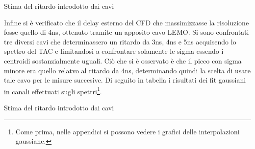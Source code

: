 \begin{table}[h]
	\centering
	
	\caption{Stima del ritardo introdotto dai cavi}
	\label{tab:calib_cavi}
\end{table}
 
Infine si è verificato che il delay esterno del CFD che massimizzasse la risoluzione fosse quello di 4ns, ottenuto tramite un apposito cavo LEMO. Si sono confrontati tre diversi cavi
che determinassero un ritardo da 3ns, 4ns e 5ns acquisendo lo spettro del TAC e limitandosi a confrontare solamente le sigma essendo i centroidi sostanzialmente uguali. Ciò che si 
è osservato è che il picco con sigma minore era quello relatvo al ritardo da 4ns, determinando quindi la scelta di usare tale cavo per le misure succesive. Di seguito in tabella
i risultati dei fit gaussiani in canali effettuati sugli spettri\footnote{Come prima, nelle appendici si possono vedere i grafici delle interpolazioni gaussiane.}. \\

\begin{table}[h]
	\centering
	
	\caption{Stima del ritardo introdotto dai cavi}
	\label{tab:calib_walkcross}
\end{table}



